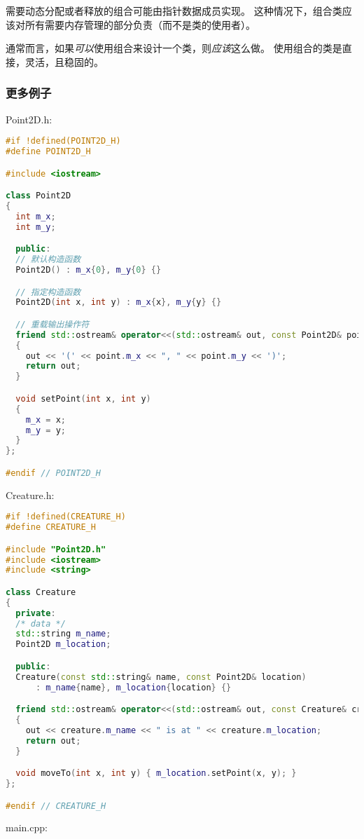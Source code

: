 \documentclass[../../LearnCpp.tex]{subfiles}
\begin{document}
需要动态分配或者释放的组合可能由指针数据成员实现。
这种情况下，组合类应该对所有需要内存管理的部分负责（而不是类的使用者）。

通常而言，如果\textit{可以}使用组合来设计一个类，则\textit{应该}这么做。
使用组合的类是直接，灵活，且稳固的。

\subsubsection*{更多例子}

Point2D.h:

\begin{lstlisting}[language=C++]
#if !defined(POINT2D_H)
#define POINT2D_H

#include <iostream>

class Point2D
{
  int m_x;
  int m_y;

  public:
  // 默认构造函数
  Point2D() : m_x{0}, m_y{0} {}

  // 指定构造函数
  Point2D(int x, int y) : m_x{x}, m_y{y} {}

  // 重载输出操作符
  friend std::ostream& operator<<(std::ostream& out, const Point2D& point)
  {
    out << '(' << point.m_x << ", " << point.m_y << ')';
    return out;
  }

  void setPoint(int x, int y)
  {
    m_x = x;
    m_y = y;
  }
};

#endif // POINT2D_H
\end{lstlisting}

Creature.h:

\begin{lstlisting}[language=C++]
#if !defined(CREATURE_H)
#define CREATURE_H

#include "Point2D.h"
#include <iostream>
#include <string>

class Creature
{
  private:
  /* data */
  std::string m_name;
  Point2D m_location;

  public:
  Creature(const std::string& name, const Point2D& location)
      : m_name{name}, m_location{location} {}

  friend std::ostream& operator<<(std::ostream& out, const Creature& creature)
  {
    out << creature.m_name << " is at " << creature.m_location;
    return out;
  }

  void moveTo(int x, int y) { m_location.setPoint(x, y); }
};

#endif // CREATURE_H
\end{lstlisting}

main.cpp:
\end{document}
